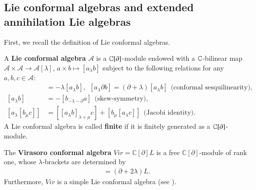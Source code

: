 \documentclass[12pt]{amsart}
\begin{document}
\subsection{Lie conformal algebras and extended annihilation Lie algebras}
First, we recall the definition of Lie conformal algebras.
\begin{defi}
\cite{DK}
A {\bf Lie conformal algebra} $\mathcal {A}$ is a $\mathbb{C}[\partial ]$-module endowed with a $\mathbb{C}$-bilinear map $\mathcal {A}\times \mathcal {A}\rightarrow \mathcal{A}[\lambda]$, $a\times b \mapsto [a_\lambda b]
$ subject to the following relations for any $a, b, c\in \mathcal {A}$:
\begin{align*}
[\partial a_\lambda b]&=-\lambda[a_\lambda b],\ \ [ a_\lambda \partial b]=(\partial+\lambda)[a_\lambda b] \ \ \mbox{(conformal\  sesquilinearity)},
\\
{[a_\lambda b]} &= -[b_{-\lambda-\partial}a] \ \ \mbox{(skew-symmetry)},
\\
{[a_\lambda[b_\mu c]]}&=[[a_\lambda b]_{\lambda+\mu
}c]+[b_\mu[a_\lambda c]]\ \ \mbox{(Jacobi \ identity)}.
\end{align*}
A Lie conformal algebra is called {\bf finite} if it is finitely generated as a $\mathbb{C}[\partial]$-module.
\end{defi}

\begin{ex}
The {\bf Virasoro conformal algebra} $Vir=\mathbb{C}[\partial]L$ is a free $\mathbb{C}[\partial]$-module of rank one, whose $\lambda$-brackets are determined by
\begin{eqnarray*}
[L_\lambda L]=(\partial+2\lambda)L.
\end{eqnarray*} Furthermore, $Vir$ is a simple Lie conformal algebra (see \cite{DK}).
\end{ex}
\end{document}
